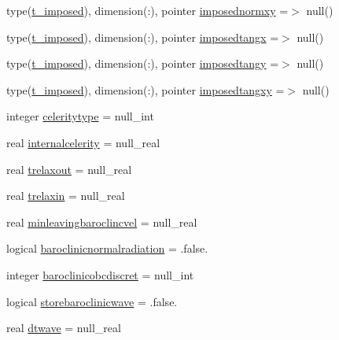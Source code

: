 \begin{DoxyCompactItemize}
\item 
type(\mbox{\hyperlink{structmodulehydrodynamic_1_1t__imposed}{t\+\_\+imposed}}), dimension(\+:), pointer \mbox{\hyperlink{structmodulehydrodynamic_1_1t__velbaroclinic_a91dd041fcb266ceb903ea6bdd6b11724}{imposednormxy}} =$>$ null()
\item 
type(\mbox{\hyperlink{structmodulehydrodynamic_1_1t__imposed}{t\+\_\+imposed}}), dimension(\+:), pointer \mbox{\hyperlink{structmodulehydrodynamic_1_1t__velbaroclinic_ad9fbe79a2009bd8554e2a92aaef61671}{imposedtangx}} =$>$ null()
\item 
type(\mbox{\hyperlink{structmodulehydrodynamic_1_1t__imposed}{t\+\_\+imposed}}), dimension(\+:), pointer \mbox{\hyperlink{structmodulehydrodynamic_1_1t__velbaroclinic_a0945f13bd2b0602f10179079daa8453d}{imposedtangy}} =$>$ null()
\item 
type(\mbox{\hyperlink{structmodulehydrodynamic_1_1t__imposed}{t\+\_\+imposed}}), dimension(\+:), pointer \mbox{\hyperlink{structmodulehydrodynamic_1_1t__velbaroclinic_a157551e491fd485ce11e936762e16f8b}{imposedtangxy}} =$>$ null()
\item 
integer \mbox{\hyperlink{structmodulehydrodynamic_1_1t__velbaroclinic_a84c76c9fe82cf00c684d186e57476631}{celeritytype}} = null\+\_\+int
\item 
real \mbox{\hyperlink{structmodulehydrodynamic_1_1t__velbaroclinic_a072a11eb1e2f2f225427d8bad19b7880}{internalcelerity}} = null\+\_\+real
\item 
real \mbox{\hyperlink{structmodulehydrodynamic_1_1t__velbaroclinic_a0069cbe740f3d85e439ec074b02ab5c2}{trelaxout}} = null\+\_\+real
\item 
real \mbox{\hyperlink{structmodulehydrodynamic_1_1t__velbaroclinic_a2021c30205cbc5f09fe826ce833699b4}{trelaxin}} = null\+\_\+real
\item 
real \mbox{\hyperlink{structmodulehydrodynamic_1_1t__velbaroclinic_af0b682f7003bc5a9abcb1c656058d96d}{minleavingbaroclincvel}} = null\+\_\+real
\item 
logical \mbox{\hyperlink{structmodulehydrodynamic_1_1t__velbaroclinic_a11e584177cdd5ec91bbf6ff0696a1078}{baroclinicnormalradiation}} = .false.
\item 
integer \mbox{\hyperlink{structmodulehydrodynamic_1_1t__velbaroclinic_a6dc3213faf8451ec734aeab8e80b1d84}{baroclinicobcdiscret}} = null\+\_\+int
\item 
logical \mbox{\hyperlink{structmodulehydrodynamic_1_1t__velbaroclinic_a61c1957959a4265ecacbfc83bc054b65}{storebaroclinicwave}} = .false.
\item 
real \mbox{\hyperlink{structmodulehydrodynamic_1_1t__velbaroclinic_a6012ec93d35e928486aa788fe1d8b110}{dtwave}} = null\+\_\+real
\end{DoxyCompactItemize}


